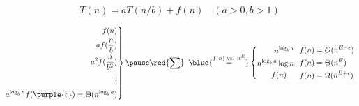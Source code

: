 
\begin{frame}{}
  \centerline{}
\end{frame}

\begin{frame}{}
  \[
    T(n) = aT(n/b) + f(n) \quad (a > 0, b > 1) 
  \]

  \pause
  \centerline{}

  \pause
  \vspace{0.30cm}
  \begin{equation*}
    \left.\begin{aligned}
      f(n) \\
      af(\frac{n}{b}) \\
      a^2f(\frac{n}{b^2}) \\
      \vdots \\
      a^{\log_b n} f(\purple{c}) = \Theta(n^{\log_b a})
    \end{aligned}\right\}
    \pause
    \red{\sum}\;\; \blue{\overset{f(n) \text{ vs. } n^{E}}{=}} \left\{\begin{aligned}
      n^{\log_b a}		 \\
      n^{\log_b a}\log n 	 \\
      f(n)		   \quad \\
    \end{aligned}\right.
    \; \left.\begin{aligned}
      f(n) &= O(n^{E-\epsilon}) \\
      f(n) &= \Theta(n^E) \\
      f(n) &= \Omega(n^{E+\epsilon}) 
    \end{aligned}\right.
  \end{equation*}
\end{frame}

